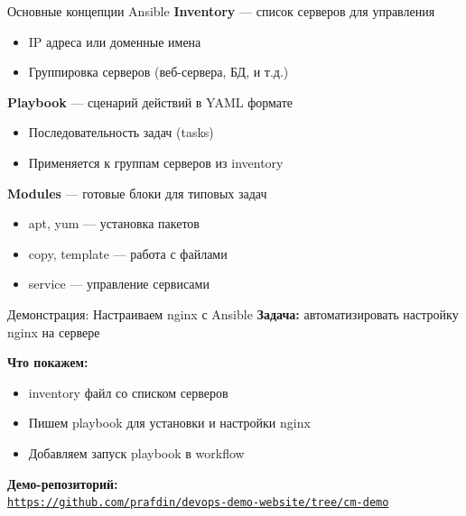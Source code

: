 \documentclass[aspectratio=169]{beamer}
\begin{document}
    \begin{frame}{Основные концепции Ansible}
        \textbf{Inventory} — список серверов для управления
        \begin{itemize}
            \item IP адреса или доменные имена
            \item Группировка серверов (веб-сервера, БД, и т.д.)
        \end{itemize}
        
        \vspace{0.3cm}
        
        \textbf{Playbook} — сценарий действий в YAML формате
        \begin{itemize}
            \item Последовательность задач (tasks)
            \item Применяется к группам серверов из inventory
        \end{itemize}
        
        \vspace{0.3cm}
        
        \textbf{Modules} — готовые блоки для типовых задач
        \begin{itemize}
            \item apt, yum — установка пакетов
            \item copy, template — работа с файлами
            \item service — управление сервисами
        \end{itemize}
    \end{frame}

    \begin{frame}{Демонстрация: Настраиваем nginx с Ansible}
        \textbf{Задача:} автоматизировать настройку nginx на сервере
        
        \vspace{0.3cm}
        
        \textbf{Что покажем:}
        \begin{itemize}
            \item inventory файл со списком серверов
            \item Пишем playbook для установки и настройки nginx
            \item Добавляем запуск playbook в workflow
        \end{itemize}

        \vspace{0.2cm}
        \textbf{Демо-репозиторий:} \\
        \href{https://github.com/prafdin/devops-demo-website/tree/cm-demo}{\texttt{https://github.com/prafdin/devops-demo-website/tree/cm-demo}}
    \end{frame}
\end{document}

